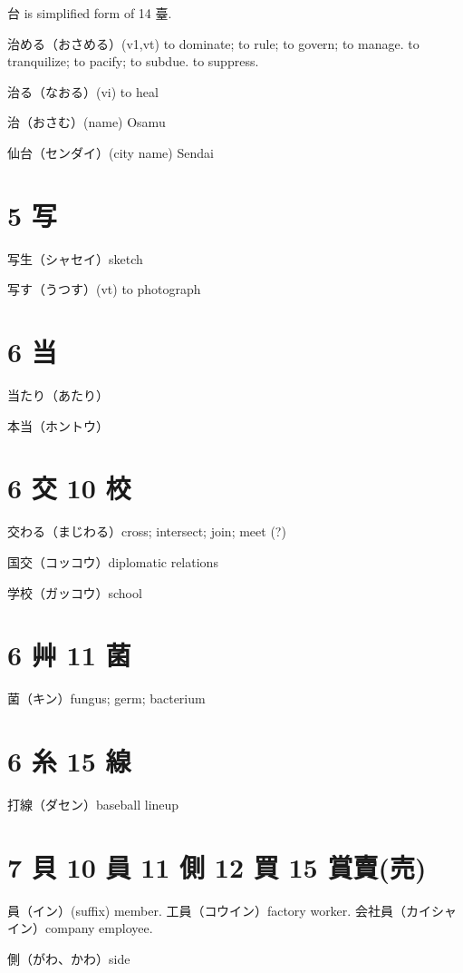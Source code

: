 台 is simplified form of 14 臺.

治める（おさめる）(v1,vt)
to dominate; to rule; to govern; to manage.
to tranquilize; to pacify; to subdue.
to suppress.

治る（なおる）(vi) to heal

治（おさむ）(name) Osamu

仙台（センダイ）(city name) Sendai

\section{5 写}

写生（シャセイ）sketch

写す（うつす）(vt) to photograph

\section{6 当}

当たり（あたり）

本当（ホントウ）

\section{6 交 10 校}

交わる（まじわる）cross; intersect; join; meet (?)

国交（コッコウ）diplomatic relations

学校（ガッコウ）school

\section{6 艸 11 菌}

菌（キン）fungus; germ; bacterium

\section{6 糸 15 線}

打線（ダセン）baseball lineup

\section{7 貝 10 員 11 側 12 買 15 賞賣(売)}

員（イン）(suffix) member.
工員（コウイン）factory worker.
会社員（カイシャイン）company employee.

側（がわ、かわ）side

